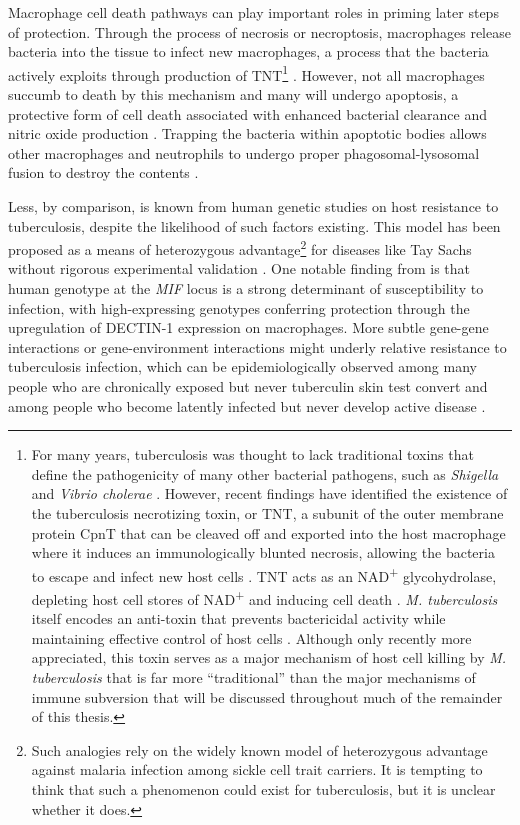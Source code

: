 Macrophage cell death pathways can play important roles in priming later steps of protection. Through the process of necrosis or necroptosis, macrophages release bacteria into the tissue to infect new macrophages, a process that the bacteria actively exploits through production of TNT\footnote{For many years, tuberculosis was thought to lack traditional toxins that define the pathogenicity of many other bacterial pathogens, such as \textit{Shigella} and \textit{Vibrio cholerae} \citep{Gyles2007, Tesh1991, Holmgren1981, Guichard2013}. However, recent findings have identified the existence of the tuberculosis necrotizing toxin, or TNT, a subunit of the outer membrane protein CpnT that can be cleaved off and exported into the host macrophage where it induces an immunologically blunted necrosis, allowing the bacteria to escape and infect new host cells \citep{Danilchanka2014, Pajuelo2021, Tak2021, IzquierdoLafuente2021}. TNT acts as an NAD\textsuperscript{+} glycohydrolase, depleting host cell stores of NAD\textsuperscript{+} and inducing cell death \citep{Sun2015, Tak2019, Pajuelo2020}. \textit{M. tuberculosis} itself encodes an anti\hyp{}toxin that prevents bactericidal activity while maintaining effective control of host cells \citep{Sun2015}. Although only recently more appreciated, this toxin serves as a major mechanism of host cell killing by \textit{M. tuberculosis} that is far more ``traditional'' than the major mechanisms of immune subversion that will be discussed throughout much of the remainder of this thesis.} \citep{Guirado2013, Pajuelo2018}. However, not all macrophages succumb to death by this mechanism and many will undergo apoptosis, a protective form of cell death associated with enhanced bacterial clearance and nitric oxide production \citep{Divangahi2013, Herbst2011}. Trapping the bacteria within apoptotic bodies allows other macrophages and neutrophils to undergo proper phagosomal\hyp{}lysosomal fusion to destroy the contents \citep{Dallenga2017, Molloy1994, Mahamed2017, Behar2011}.

Less, by comparison, is known from human genetic studies on host resistance to tuberculosis, despite the likelihood of such factors existing. This model has been proposed as a means of heterozygous advantage\footnote{Such analogies rely on the widely known model of heterozygous advantage against malaria infection among sickle cell trait carriers. It is tempting to think that such a phenomenon could exist for tuberculosis, but it is unclear whether it does.} for diseases like Tay Sachs without rigorous experimental validation \citep{Spyropoulous1981}. One notable finding from \citet{Das2013b} is that human genotype at the \textit{MIF} locus is a strong determinant of susceptibility to infection, with high-expressing genotypes conferring protection through the upregulation of DECTIN-1 expression on macrophages. More subtle gene\hyp{}gene interactions or gene\hyp{}environment interactions might underly relative resistance to tuberculosis infection, which can be epidemiologically observed among many people who are chronically exposed but never tuberculin skin test convert and among people who become latently infected but never develop active disease \citep{Flynn2011, Orme2015}.


